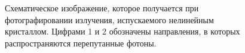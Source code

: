 \begin{figure}
\centering


\caption{Схематическое изображение, которое получается при
  фотографировании излучения, испускаемого нелинейным кристаллом.
  Цифрами 1 и 2 обозначены направления, в которых распространяются
  перепутанные фотоны.}
\label{figEntangGen2}
\end{figure}
